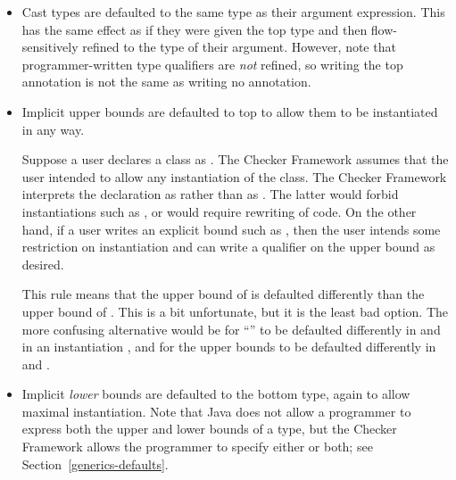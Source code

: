 \begin{itemize}
\item
Cast types are defaulted to the same type as their argument expression.
This has the same effect as if they were given the
top type and then flow-sensitively refined to the type of their argument.
However, note that programmer-written type qualifiers are \emph{not}
refined, so writing the top annotation is not the same as writing no annotation.

\item
Implicit upper bounds are defaulted to top to allow them to be instantiated
in any way.

Suppose a user declares a class as .
The Checker Framework assumes that the user intended to allow any
instantiation of the class.  The Checker Framework interprets the
declaration as  rather than as .  The latter would forbid
instantiations such as , or would require
rewriting of code.  On the other hand, if a user writes an explicit bound
such as , then the user
intends some restriction on instantiation and can write a qualifier on the
upper bound as desired.

This rule means that the upper bound of  is defaulted
differently than the upper bound of .
This is a bit unfortunate, but it is the least bad option.  The
more confusing alternative would be for ``'' to be defaulted
differently in  and in an
instantiation , and for the upper bounds to be defaulted
differently in 
and .

\item
Implicit \emph{lower} bounds are defaulted to the bottom type, again to allow
maximal instantiation.  Note that Java does not allow a programmer to
express both the upper and lower bounds of a type, but the Checker
Framework allows the programmer to specify either or both;
see Section~\ref{generics-defaults}.

\end{itemize}

